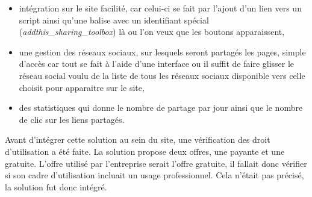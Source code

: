 \documentclass[12pt,a4paper]{article}
\begin{document}
\begin{itemize}
\item intégration sur le site facilité, car celui-ci se fait par l'ajout d'un lien vers un script ainsi qu'une balise avec un identifiant spécial (\textit{addthis\_sharing\_toolbox}) là ou l'on veux que les boutons apparaissent,
\item une gestion des réseaux sociaux, sur lesquels seront partagés les pages, simple d'accès car tout se fait à l'aide d'une interface ou il suffit de faire glisser le réseau social voulu de la liste de tous les réseaux sociaux disponible vers celle choisit pour apparaitre sur le site,
\item des statistiques qui donne le nombre de partage par jour ainsi que le nombre de clic sur les liens partagés.
\end{itemize}\par
Avant d'intégrer cette solution au sein du site, une vérification des droit d'utilisation a été faite. La solution propose deux offres, une payante et une gratuite. L'offre utilisé par l'entreprise serait l'offre gratuite, il fallait donc vérifier si son cadre d'utilisation incluait un usage professionnel. Cela n'était pas précisé, la solution fut donc intégré.\par
\end{document}
